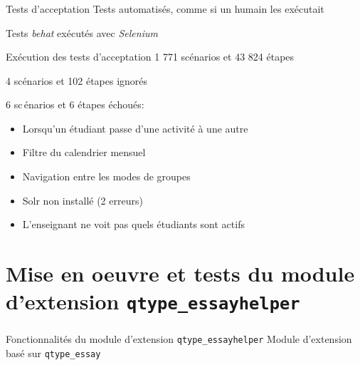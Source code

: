 \documentclass{beamer}
\begin{document}
  \begin{frame}
    \frametitle{\insertsection}
    \begin{block}{Tests d'acceptation}
      Tests automatis\'es, comme si un humain les ex\'ecutait
  
      Tests \textit{behat} ex\'ecut\'es avec \textit{Selenium}
    \end{block}
  
    \vfill
  
    \begin{block}{Ex\'ecution des tests d'acceptation}
      1 771 sc\'enarios et 43 824 \'etapes
  
      4 sc\'enarios et 102 \'etapes ignor\'es
  
      6 sc\,énarios et 6 \'etapes \'echou\'es:
      \begin{itemize}
        \item Lorsqu'un \'etudiant passe d'une activit\'e \`a une autre
        \item Filtre du calendrier mensuel
        \item Navigation entre les modes de groupes
        \item Solr non install\'e (2 erreurs)
        \item L'enseignant ne voit pas quels \'etudiants sont actifs
      \end{itemize}
    \end{block}
    \vfill
  \end{frame}
  
  \section[Mise en oeuvre]{Mise en oeuvre et tests du module d'extension \texttt{qtype\_essayhelper}}
  \begin{frame}
    \frametitle{\insertsection}
    \begin{block}{Fonctionnalit\'es du module d'extension \texttt{qtype\_essayhelper}}
      Module d'extension bas\'e sur \texttt{qtype\_essay}
    \end{block}
  \end{frame}
  
\end{document}
